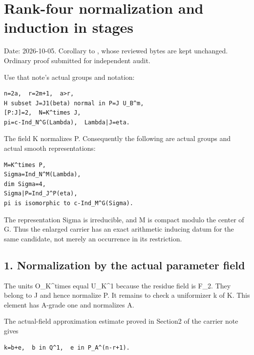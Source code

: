 \clearpage
\section{Rank-four normalization and induction in stages}\label{app:rank4_stages}

Date: 2026-10-05. Corollary to , whose
reviewed bytes are kept unchanged. Ordinary proof submitted for
independent audit.

Use that note's actual groups and notation:

\begin{Verbatim}[fontsize=\small,breaklines=true,breakanywhere=true]
n=2a,  r=2m+1,  a>r,
H subset J=J1(beta) normal in P=J U_B^m,
[P:J]=2,  N=K^times J,
pi=c-Ind_N^G(Lambda),  Lambda|J=eta.
\end{Verbatim}

The field K normalizes P. Consequently the following are actual groups
and actual smooth representations:

\begin{Verbatim}[fontsize=\small,breaklines=true,breakanywhere=true]
M=K^times P,
Sigma=Ind_N^M(Lambda),
dim Sigma=4,
Sigma|P=Ind_J^P(eta),
pi is isomorphic to c-Ind_M^G(Sigma).
\end{Verbatim}

The representation Sigma is irreducible, and M is compact modulo the
center of G. Thus the enlarged carrier has an exact arithmetic inducing
datum for the same candidate, not merely an occurrence in its
restriction.

\hypertarget{rank4_stages-normalization-by-the-actual-parameter-field}{%
\subsection{1. Normalization by the actual parameter
field}\label{rank4_stages-normalization-by-the-actual-parameter-field}}

The units O\_K\^{}times equal U\_K\^{}1 because the residue field is
F\_2. They belong to J and hence normalize P. It remains to check a
uniformizer k of K. This element has A-grade one and normalizes A.

The actual-field approximation estimate proved in Section2 of the
carrier note gives

\begin{Verbatim}[fontsize=\small,breaklines=true,breakanywhere=true]
k=b+e,  b in Q^1,  e in P_A^(n-r+1).
\end{Verbatim}

